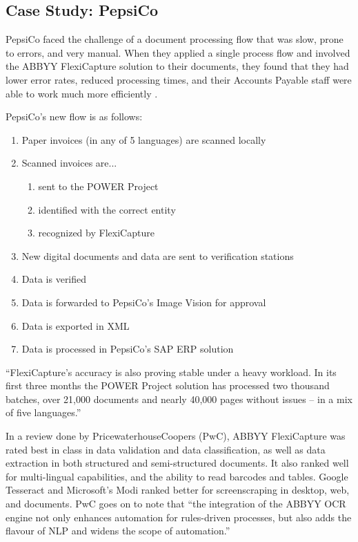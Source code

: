 \documentclass[conference]{IEEEtran}
\begin{document}
\subsection{Case Study: PepsiCo}
PepsiCo faced the challenge of a document processing flow that was slow, prone to errors, and very manual. When they applied a single process flow and involved the ABBYY FlexiCapture solution to their documents, they found that they had lower error rates, reduced processing times, and their Accounts Payable staff were able to work much more efficiently \cite{pepsico}.

PepsiCo's new flow is as follows:
\begin{enumerate}
\item Paper invoices (in any of 5 languages) are scanned locally
\item Scanned invoices are...
    \begin{enumerate}
        \item sent to the POWER Project
        \item identified with the correct entity
        \item recognized by FlexiCapture
    \end{enumerate}
\item New digital documents and data are sent to verification stations
\item Data is verified
\item Data is forwarded to PepsiCo's Image Vision for approval
\item Data is exported in XML
\item Data is processed in PepsiCo's SAP ERP solution
\end{enumerate}

``FlexiCapture's accuracy is also proving stable under a heavy workload. In its first three months the POWER Project solution has processed two thousand batches, over 21,000 documents and nearly 40,000 pages without issues – in a mix of five languages.'' \cite{pepsico}

In a review done by PricewaterhouseCoopers (PwC), ABBYY FlexiCapture was rated best in class in data validation and data classification, as well as data extraction in both structured and semi-structured documents. It also ranked well for multi-lingual capabilities, and the ability to read barcodes and tables. Google Tesseract and Microsoft's Modi ranked better for screenscraping in desktop, web, and documents. PwC goes on to note that ``the integration of the ABBYY OCR engine not only enhances automation for rules-driven processes, but also adds the flavour of NLP and widens the scope of automation.'' \cite{pwc2018robotic}
\end{document}
